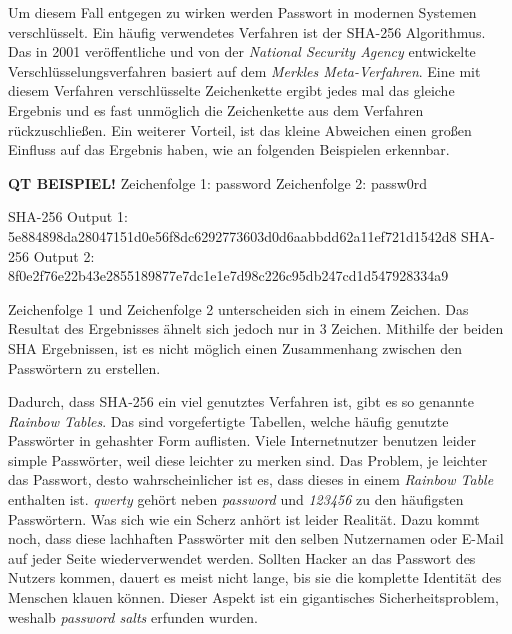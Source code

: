 Um diesem Fall entgegen zu wirken werden Passwort in modernen Systemen verschlüsselt. Ein häufig verwendetes Verfahren ist der SHA-256 Algorithmus. Das in 2001 veröffentliche und von der \textit{National Security Agency} entwickelte Verschlüsselungsverfahren basiert auf dem \textit{Merkles Meta-Verfahren}. Eine mit diesem Verfahren verschlüsselte Zeichenkette ergibt jedes mal das gleiche Ergebnis und es fast unmöglich die Zeichenkette aus dem Verfahren rückzuschließen. Ein weiterer Vorteil, ist das kleine Abweichen einen großen Einfluss auf das Ergebnis haben, wie an folgenden Beispielen erkennbar.

\textbf{QT BEISPIEL!} \break
Zeichenfolge 1: password \break
Zeichenfolge 2: passw0rd \break\par

SHA-256 Output 1: \break 5e884898da28047151d0e56f8dc6292773603d0d6aabbdd62a11ef721d1542d8 \break
SHA-256 Output 2: \break 8f0e2f76e22b43e2855189877e7dc1e1e7d98c226c95db247cd1d547928334a9

Zeichenfolge 1 und Zeichenfolge 2 unterscheiden sich in einem Zeichen. Das Resultat des Ergebnisses ähnelt sich jedoch nur in 3 Zeichen. Mithilfe der beiden SHA Ergebnissen, ist es nicht möglich einen Zusammenhang zwischen den Passwörtern zu erstellen.

Dadurch, dass SHA-256 ein viel genutztes Verfahren ist, gibt es so genannte \textit{Rainbow Tables}. Das sind vorgefertigte Tabellen, welche häufig genutzte Passwörter in gehashter Form auflisten. Viele Internetnutzer benutzen leider simple Passwörter, weil diese leichter zu merken sind. Das Problem, je leichter das Passwort, desto wahrscheinlicher ist es, dass dieses in einem \textit{Rainbow Table} enthalten ist.
\textit{qwerty} gehört neben \textit{password} und \textit{123456} zu den häufigsten Passwörtern. Was sich wie ein Scherz anhört ist leider Realität. Dazu kommt noch, dass diese lachhaften Passwörter mit den selben Nutzernamen oder E-Mail auf jeder Seite wiederverwendet werden. Sollten Hacker an das Passwort des Nutzers kommen, dauert es meist nicht lange, bis sie die komplette Identität des Menschen klauen können. Dieser Aspekt ist ein gigantisches Sicherheitsproblem, weshalb \textit{password salts} erfunden wurden.

